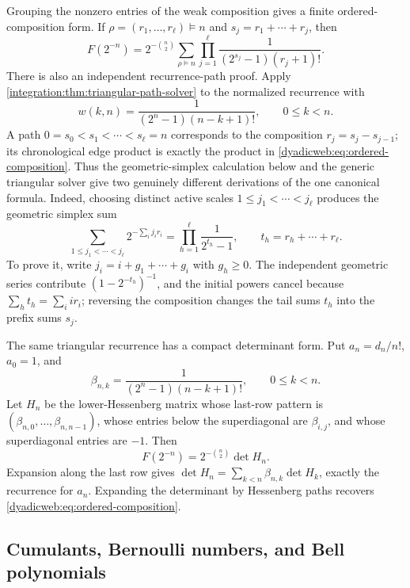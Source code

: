 \documentclass[11pt,oneside]{article}
\theoremstyle{definition}
\theoremstyle{remark}
\begin{document}
Grouping the nonzero entries of the weak composition gives a finite ordered-composition
form.  If $\rho=(r_1,\ldots,r_\ell)\vDash n$ and
$s_j=r_1+\cdots+r_j$, then
\begin{equation}
 \boxed{
 F(2^{-n})=2^{-\binom n2}
 \sum_{\rho\vDash n}\prod_{j=1}^{\ell}
 \frac1{(2^{s_j}-1)(r_j+1)!}.}
 \label{dyadicweb:eq:ordered-composition}
\end{equation}
There is also an independent recurrence-path proof.  Apply
\cref{integration:thm:triangular-path-solver} to the normalized recurrence with
\[
 w(k,n)=\frac1{(2^n-1)(n-k+1)!},\qquad 0\leq k<n.
\]
A path \(0=s_0<s_1<\cdots<s_\ell=n\) corresponds to the composition
\(r_j=s_j-s_{j-1}\); its chronological edge product is exactly the product in
\eqref{dyadicweb:eq:ordered-composition}.  Thus the geometric-simplex calculation below
and the generic triangular solver give two genuinely different derivations of the one
canonical formula.
Indeed, choosing distinct active scales $1\le j_1<\cdots<j_\ell$ produces the
geometric simplex sum
\begin{equation}
 \sum_{1\le j_1<\cdots<j_\ell}2^{-\sum_i j_ir_i}
 =\prod_{h=1}^{\ell}\frac1{2^{t_h}-1},\qquad
 t_h=r_h+\cdots+r_\ell.
 \label{dyadicweb:eq:geometric-simplex}
\end{equation}
To prove it, write $j_i=i+g_1+\cdots+g_i$ with $g_h\ge0$.  The independent
geometric series contribute $(1-2^{-t_h})^{-1}$, and the initial powers cancel
because $\sum_ht_h=\sum_iir_i$; reversing the composition changes the tail sums
$t_h$ into the prefix sums $s_j$.

The same triangular recurrence has a compact determinant form.  Put
$a_n=d_n/n!$, $a_0=1$, and
\begin{equation}
 \beta_{n,k}=\frac1{(2^n-1)(n-k+1)!},\qquad 0\le k<n.
 \label{dyadicweb:eq:Hessenberg-beta}
\end{equation}
Let $H_n$ be the lower-Hessenberg matrix whose last-row pattern is
$(\beta_{n,0},\ldots,\beta_{n,n-1})$, whose entries below the superdiagonal are
$\beta_{i,j}$, and whose superdiagonal entries are $-1$.  Then
\begin{equation}
 \boxed{F(2^{-n})=2^{-\binom n2}\det H_n.}
 \label{dyadicweb:eq:Hessenberg-determinant}
\end{equation}
Expansion along the last row gives
$\det H_n=\sum_{k<n}\beta_{n,k}\det H_k$, exactly the recurrence for $a_n$.
Expanding the determinant by Hessenberg paths recovers
\eqref{dyadicweb:eq:ordered-composition}.

\subsection{Cumulants, Bernoulli numbers, and Bell polynomials}
\end{document}
